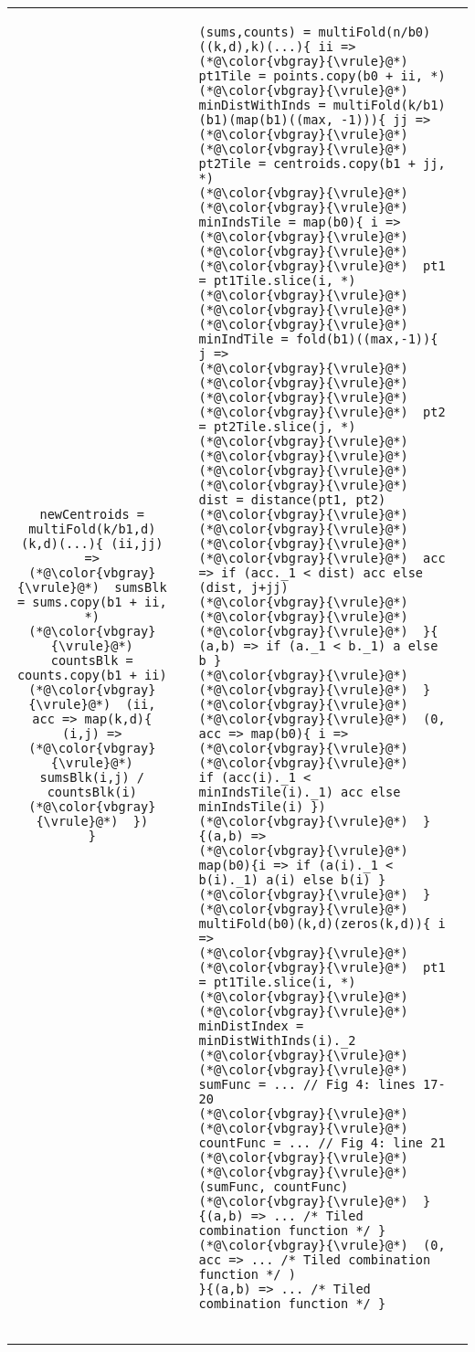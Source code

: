 \begin{tabular}{cm{}m{}m{}}
{\begin{lstlisting}
newCentroids = multiFold(k/b1,d)(k,d)(...){ (ii,jj) =>
(*@\color{vbgray}{\vrule}@*)  sumsBlk = sums.copy(b1 + ii, *)
(*@\color{vbgray}{\vrule}@*)  countsBlk = counts.copy(b1 + ii)
(*@\color{vbgray}{\vrule}@*)  (ii, acc => map(k,d){ (i,j) =>
(*@\color{vbgray}{\vrule}@*)    sumsBlk(i,j) / countsBlk(i)
(*@\color{vbgray}{\vrule}@*)  })
}
\end{lstlisting}} & \hfill &
{\begin{lstlisting}
(sums,counts) = multiFold(n/b0)((k,d),k)(...){ ii =>
(*@\color{vbgray}{\vrule}@*)  pt1Tile = points.copy(b0 + ii, *)
(*@\color{vbgray}{\vrule}@*)  minDistWithInds = multiFold(k/b1)(b1)(map(b1)((max, -1))){ jj =>
(*@\color{vbgray}{\vrule}@*)  (*@\color{vbgray}{\vrule}@*)  pt2Tile = centroids.copy(b1 + jj, *)
(*@\color{vbgray}{\vrule}@*)  (*@\color{vbgray}{\vrule}@*)  minIndsTile = map(b0){ i =>
(*@\color{vbgray}{\vrule}@*)  (*@\color{vbgray}{\vrule}@*)  (*@\color{vbgray}{\vrule}@*)  pt1 = pt1Tile.slice(i, *)
(*@\color{vbgray}{\vrule}@*)  (*@\color{vbgray}{\vrule}@*)  (*@\color{vbgray}{\vrule}@*)  minIndTile = fold(b1)((max,-1)){ j =>
(*@\color{vbgray}{\vrule}@*)  (*@\color{vbgray}{\vrule}@*)  (*@\color{vbgray}{\vrule}@*)  (*@\color{vbgray}{\vrule}@*)  pt2 = pt2Tile.slice(j, *)
(*@\color{vbgray}{\vrule}@*)  (*@\color{vbgray}{\vrule}@*)  (*@\color{vbgray}{\vrule}@*)  (*@\color{vbgray}{\vrule}@*)  dist = distance(pt1, pt2)
(*@\color{vbgray}{\vrule}@*)  (*@\color{vbgray}{\vrule}@*)  (*@\color{vbgray}{\vrule}@*)  (*@\color{vbgray}{\vrule}@*)  acc => if (acc._1 < dist) acc else (dist, j+jj)
(*@\color{vbgray}{\vrule}@*)  (*@\color{vbgray}{\vrule}@*)  (*@\color{vbgray}{\vrule}@*)  }{ (a,b) => if (a._1 < b._1) a else b }
(*@\color{vbgray}{\vrule}@*)  (*@\color{vbgray}{\vrule}@*)  }
(*@\color{vbgray}{\vrule}@*)  (*@\color{vbgray}{\vrule}@*)  (0, acc => map(b0){ i =>
(*@\color{vbgray}{\vrule}@*)  (*@\color{vbgray}{\vrule}@*)    if (acc(i)._1 < minIndsTile(i)._1) acc else minIndsTile(i) })
(*@\color{vbgray}{\vrule}@*)  }{(a,b) =>
(*@\color{vbgray}{\vrule}@*)    map(b0){i => if (a(i)._1 < b(i)._1) a(i) else b(i) }
(*@\color{vbgray}{\vrule}@*)  }
(*@\color{vbgray}{\vrule}@*)  multiFold(b0)(k,d)(zeros(k,d)){ i =>
(*@\color{vbgray}{\vrule}@*)  (*@\color{vbgray}{\vrule}@*)  pt1 = pt1Tile.slice(i, *)
(*@\color{vbgray}{\vrule}@*)  (*@\color{vbgray}{\vrule}@*)  minDistIndex = minDistWithInds(i)._2
(*@\color{vbgray}{\vrule}@*)  (*@\color{vbgray}{\vrule}@*)  sumFunc = ... // Fig 4: lines 17-20
(*@\color{vbgray}{\vrule}@*)  (*@\color{vbgray}{\vrule}@*)  countFunc = ... // Fig 4: line 21
(*@\color{vbgray}{\vrule}@*)  (*@\color{vbgray}{\vrule}@*)  (sumFunc, countFunc)
(*@\color{vbgray}{\vrule}@*)  }{(a,b) => ... /* Tiled combination function */ }
(*@\color{vbgray}{\vrule}@*)  (0, acc => ... /* Tiled combination function */ )
}{(a,b) => ... /* Tiled combination function */ }


\end{lstlisting}}
\end{tabular}
